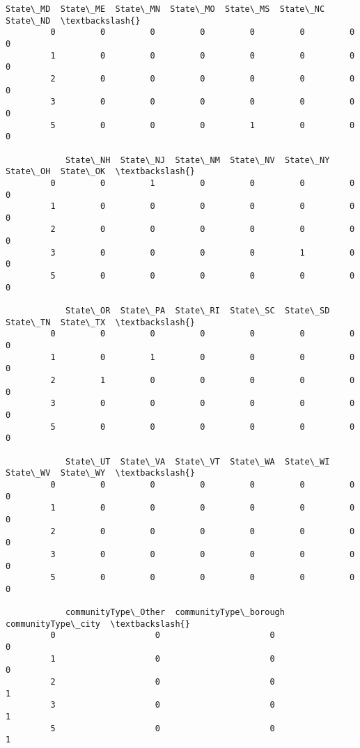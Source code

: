 \documentclass[11pt]{llncs}
\begin{document}
\begin{Verbatim}[commandchars=\\\{\}]
            State\_MD  State\_ME  State\_MN  State\_MO  State\_MS  State\_NC  State\_ND  \textbackslash{}
         0         0         0         0         0         0         0         0   
         1         0         0         0         0         0         0         0   
         2         0         0         0         0         0         0         0   
         3         0         0         0         0         0         0         0   
         5         0         0         0         1         0         0         0   
         
            State\_NH  State\_NJ  State\_NM  State\_NV  State\_NY  State\_OH  State\_OK  \textbackslash{}
         0         0         1         0         0         0         0         0   
         1         0         0         0         0         0         0         0   
         2         0         0         0         0         0         0         0   
         3         0         0         0         0         1         0         0   
         5         0         0         0         0         0         0         0   
         
            State\_OR  State\_PA  State\_RI  State\_SC  State\_SD  State\_TN  State\_TX  \textbackslash{}
         0         0         0         0         0         0         0         0   
         1         0         1         0         0         0         0         0   
         2         1         0         0         0         0         0         0   
         3         0         0         0         0         0         0         0   
         5         0         0         0         0         0         0         0   
         
            State\_UT  State\_VA  State\_VT  State\_WA  State\_WI  State\_WV  State\_WY  \textbackslash{}
         0         0         0         0         0         0         0         0   
         1         0         0         0         0         0         0         0   
         2         0         0         0         0         0         0         0   
         3         0         0         0         0         0         0         0   
         5         0         0         0         0         0         0         0   
         
            communityType\_Other  communityType\_borough  communityType\_city  \textbackslash{}
         0                    0                      0                   0   
         1                    0                      0                   0   
         2                    0                      0                   1   
         3                    0                      0                   1   
         5                    0                      0                   1   
         

\end{Verbatim}
\end{document}
